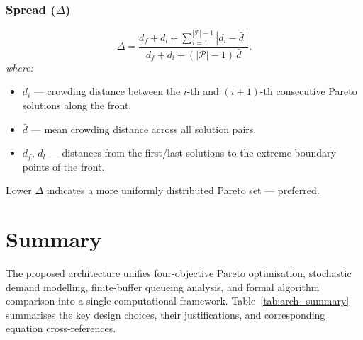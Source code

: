 \subsubsection*{Spread ($\Delta$)}
\begin{equation}
\Delta =
\frac{d_f + d_l
      + \displaystyle\sum_{i=1}^{|\mathcal{P}|-1}|d_i - \bar{d}\,|}
     {d_f + d_l + (|\mathcal{P}|-1)\,\bar{d}}.
\label{eq:spread}
\end{equation}
\textit{where:}
\begin{itemize}
  \item $d_i$ — crowding distance between the $i$-th and $(i{+}1)$-th
        consecutive Pareto solutions along the front,
  \item $\bar{d}$ — mean crowding distance across all solution pairs,
  \item $d_f$, $d_l$ — distances from the first/last solutions to the
        extreme boundary points of the front.
\end{itemize}
Lower $\Delta$ indicates a more uniformly distributed Pareto set — preferred.

\section{Summary}
\label{sec:arch_summary}

\noindent
The proposed architecture unifies four-objective Pareto optimisation,
stochastic demand modelling, finite-buffer queueing analysis, and formal
algorithm comparison into a single computational framework.
Table~\ref{tab:arch_summary} summarises the key design choices, their
justifications, and corresponding equation cross-references.

